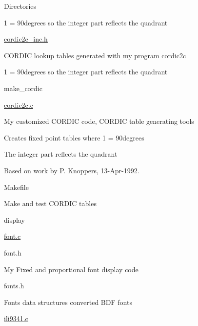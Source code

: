 \begin{DoxyParagraph}{Directories}
\begin{DoxyItemize}
\begin{DoxyItemize}
\begin{DoxyItemize}
\item 1 = 90degrees so the integer part reflects the quadrant
\end{DoxyItemize}
\item \hyperlink{cordic2c__inc_8h}{cordic2c\-\_\-inc.\-h}
\begin{DoxyItemize}
\item C\-O\-R\-D\-I\-C lookup tables generated with my program cordic2c
\item 1 = 90degrees so the integer part reflects the quadrant
\end{DoxyItemize}
\item make\-\_\-cordic
\begin{DoxyItemize}
\item \hyperlink{cordic2c_8c}{cordic2c.\-c}
\begin{DoxyItemize}
\item My customized C\-O\-R\-D\-I\-C code, C\-O\-R\-D\-I\-C table generating tools
\item Creates fixed point tables where 1 = 90degrees
\begin{DoxyItemize}
\item The integer part reflects the quadrant
\end{DoxyItemize}
\item Based on work by P. Knoppers, 13-\/\-Apr-\/1992.
\end{DoxyItemize}
\item Makefile
\begin{DoxyItemize}
\item Make and test C\-O\-R\-D\-I\-C tables
\end{DoxyItemize}
\end{DoxyItemize}
\end{DoxyItemize}
\item display
\begin{DoxyItemize}
\item \hyperlink{font_8c}{font.\-c}
\item font.\-h
\begin{DoxyItemize}
\item My Fixed and proportional font display code
\end{DoxyItemize}
\item fonts.\-h
\begin{DoxyItemize}
\item Fonts data structures converted B\-D\-F fonts
\end{DoxyItemize}
\item \hyperlink{ili9341_8c}{ili9341.\-c}

\end{DoxyItemize}
\end{DoxyItemize}
\end{DoxyParagraph}
